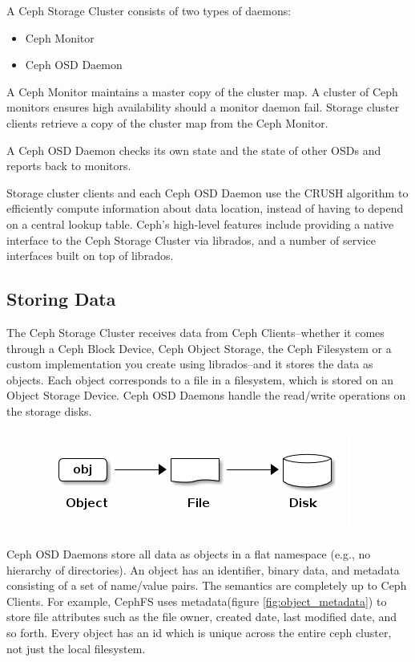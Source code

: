 \documentclass[12pt,a4paper]{report}
\begin{document}
A Ceph Storage Cluster consists of two types of daemons:

\begin{itemize}
	\item Ceph Monitor
	\item Ceph OSD Daemon
\end{itemize}

A Ceph Monitor maintains a master copy of the cluster map. A cluster of Ceph
monitors ensures high availability should a monitor daemon fail. Storage
cluster clients retrieve a copy of the cluster map from the Ceph Monitor.

A Ceph OSD Daemon checks its own state and the state of other OSDs and reports
back to monitors.

Storage cluster clients and each Ceph OSD Daemon use the CRUSH algorithm to
efficiently compute information about data location, instead of having to
depend on a central lookup table. Ceph’s high-level features include providing
a native interface to the Ceph Storage Cluster via librados, and a number of
service interfaces built on top of librados.

\subsection{Storing Data}

The Ceph Storage Cluster receives data from Ceph Clients–whether it comes
through a Ceph Block Device, Ceph Object Storage, the Ceph Filesystem or a
custom implementation you create using librados–and it stores the data as
objects. Each object corresponds to a file in a filesystem, which is stored on
an Object Storage Device. Ceph OSD Daemons handle the read/write operations on
the storage disks.

\begin{figure}[h]
	\includegraphics[scale=0.75]{object_file_disk.png}
	\label{fig:object_file_disk}
\end{figure}

Ceph OSD Daemons store all data as objects in a flat namespace (e.g., no
hierarchy of directories). An object has an identifier, binary data, and
metadata consisting of a set of name/value pairs. The semantics are completely
up to Ceph Clients. For example, CephFS uses metadata(figure
\ref{fig:object_metadata}) to store file attributes such as the file owner,
created date, last modified date, and so forth. Every object has an id which is
unique across the entire ceph cluster, not just the local filesystem.
\end{document}
